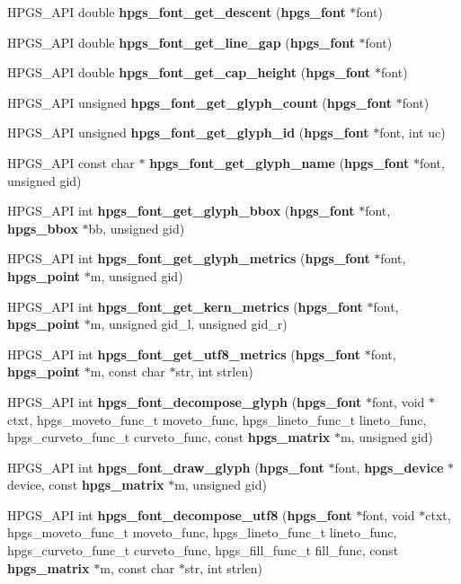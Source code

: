 \begin{CompactItemize}
\item 
HPGS\_\-API double {\bf hpgs\_\-font\_\-get\_\-descent} ({\bf hpgs\_\-font} $\ast$font)
\item 
HPGS\_\-API double {\bf hpgs\_\-font\_\-get\_\-line\_\-gap} ({\bf hpgs\_\-font} $\ast$font)
\item 
HPGS\_\-API double {\bf hpgs\_\-font\_\-get\_\-cap\_\-height} ({\bf hpgs\_\-font} $\ast$font)
\item 
HPGS\_\-API unsigned {\bf hpgs\_\-font\_\-get\_\-glyph\_\-count} ({\bf hpgs\_\-font} $\ast$font)
\item 
HPGS\_\-API unsigned {\bf hpgs\_\-font\_\-get\_\-glyph\_\-id} ({\bf hpgs\_\-font} $\ast$font, int uc)
\item 
HPGS\_\-API const char $\ast$ {\bf hpgs\_\-font\_\-get\_\-glyph\_\-name} ({\bf hpgs\_\-font} $\ast$font, unsigned gid)
\item 
HPGS\_\-API int {\bf hpgs\_\-font\_\-get\_\-glyph\_\-bbox} ({\bf hpgs\_\-font} $\ast$font, {\bf hpgs\_\-bbox} $\ast$bb, unsigned gid)
\item 
HPGS\_\-API int {\bf hpgs\_\-font\_\-get\_\-glyph\_\-metrics} ({\bf hpgs\_\-font} $\ast$font, {\bf hpgs\_\-point} $\ast$m, unsigned gid)
\item 
HPGS\_\-API int {\bf hpgs\_\-font\_\-get\_\-kern\_\-metrics} ({\bf hpgs\_\-font} $\ast$font, {\bf hpgs\_\-point} $\ast$m, unsigned gid\_\-l, unsigned gid\_\-r)
\item 
HPGS\_\-API int {\bf hpgs\_\-font\_\-get\_\-utf8\_\-metrics} ({\bf hpgs\_\-font} $\ast$font, {\bf hpgs\_\-point} $\ast$m, const char $\ast$str, int strlen)
\item 
HPGS\_\-API int {\bf hpgs\_\-font\_\-decompose\_\-glyph} ({\bf hpgs\_\-font} $\ast$font, void $\ast$ctxt, hpgs\_\-moveto\_\-func\_\-t moveto\_\-func, hpgs\_\-lineto\_\-func\_\-t lineto\_\-func, hpgs\_\-curveto\_\-func\_\-t curveto\_\-func, const {\bf hpgs\_\-matrix} $\ast$m, unsigned gid)
\item 
HPGS\_\-API int {\bf hpgs\_\-font\_\-draw\_\-glyph} ({\bf hpgs\_\-font} $\ast$font, {\bf hpgs\_\-device} $\ast$device, const {\bf hpgs\_\-matrix} $\ast$m, unsigned gid)
\item 
HPGS\_\-API int {\bf hpgs\_\-font\_\-decompose\_\-utf8} ({\bf hpgs\_\-font} $\ast$font, void $\ast$ctxt, hpgs\_\-moveto\_\-func\_\-t moveto\_\-func, hpgs\_\-lineto\_\-func\_\-t lineto\_\-func, hpgs\_\-curveto\_\-func\_\-t curveto\_\-func, hpgs\_\-fill\_\-func\_\-t fill\_\-func, const {\bf hpgs\_\-matrix} $\ast$m, const char $\ast$str, int strlen)
\item 

\end{CompactItemize}
